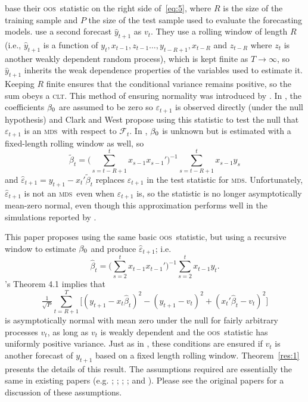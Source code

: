 \documentclass[11pt,fleqn]{article}
\newcommand\citepos[2][]{\citeauthor{#2}'s \citeyearpar[#1]{#2}}
\theoremstyle{definition}
\newcommand{\btrue}[1][]{\if#1*\hat\beta_{T+1}\else\beta_0\fi}
\newcommand{\osum}[1]{\sum_{#1=R+1}^T}
\newcommand{\oclt}[1]{\tfrac{1}{\sqrt{P}} \osum{#1}}
\newcommand{\clt}{\textsc{clt}}
\newcommand{\mds}{\textsc{mds}}
\newcommand{\oos}{\textsc{oos}}
\begin{document}
\citet{ClW:06,ClW:07} base their \oos\ statistic on the right side
of~\eqref{eq:5}, where $R$ is the size of the training sample and $P$
the size of the test sample used to evaluate the forecasting models.
\citet{ClW:06} use a second forecast $\hat{y}_{t+1}$ as $v_t$.  They
use a rolling window of length $R$ (i.e., $\hat{y}_{t+1}$ is a
function of $y_t, x_{t-1}, z_{t-1} \dots, y_{t-R+1}, x_{t-R}$ and
$z_{t-R}$ where $z_t$ is another weakly dependent random process),
which is kept finite as $T \to \infty$, so $\hat{y}_{t+1}$ inherits
the weak dependence properties of the variables used to estimate it.
Keeping $R$ finite ensures that the conditional variance remains
positive, so the sum obeys a \clt.  This method of ensuring normality
was introduced by \citet{GiW:06}.  In \citet{ClW:06}, the coefficients $\btrue$ are
assumed to be zero so $\varepsilon_{t+1}$ is observed directly (under
the null hypothesis) and Clark and West propose using this statistic
to test the null that $\varepsilon_{t+1}$ is an \mds\ with respect to
$\mathcal{F}_t$.  In \citet{ClW:07}, $\btrue$ is unknown but is
estimated with a fixed-length rolling window as well, so
\begin{equation*}
  \tilde{\beta}_t = \Big(\sum_{s=t-R+1}^t x_{s-1} x_{s-1}'\Big)^{-1}
  \sum_{s=t-R+1}^t x_{s-1} y_s
\end{equation*}
and $\hat{\varepsilon}_{t+1} = y_{t+1} - x_t'\tilde{\beta}_t$ replaces
$\varepsilon_{t+1}$ in the test statistic for \mds.  Unfortunately,
$\hat{\varepsilon}_{t+1}$ is not an \mds\ even when
$\varepsilon_{t+1}$ is, so the statistic is no longer asymptotically
mean-zero normal, even though this approximation performs well in the
simulations reported by \citet{ClW:07}.

This paper proposes using the same basic \oos\ statistic, 
but using a recursive window to estimate $\btrue$ and produce
$\hat{\varepsilon}_{t+1}$; i.e.
\begin{equation}
  \label{eq:8}
  \hat{\beta}_t = \Big(\sum_{s=2}^{t} x_{t-1} x_{t-1}'\Big)^{-1}
  \sum_{s=2}^t x_{t-1} y_t.
\end{equation}
\citepos{Wes:96} Theorem 4.1 implies that
\begin{equation*}
  \oclt{t} \Big[(y_{t+1} -
  x_t\hat{\beta}_t)^2 - (y_{t+1} - v_t)^2 + (x_t'\hat{\beta}_t - v_t)^2 \Big]
\end{equation*}
is asymptotically normal with mean zero under the null for fairly
arbitrary processes $v_t$, as long as $v_t$ is weakly dependent and
the \oos\ statistic has uniformly positive variance.  Just as in
\citet{ClW:06}, these conditions are ensured if $v_t$ is another
forecast of $y_{t+1}$ based on a fixed length rolling window.
Theorem~\ref{res:1} presents the details of this result.  The
assumptions required are essentially the same in existing papers
(e.g. \citealp{Wes:96}; \citealp{WeM:98}; \citealp{Mcc:00};
\citealp{GiW:06}; and \citealp{ClW:06,ClW:07}).  Please see the
original papers for a discussion of these assumptions.
\end{document}
